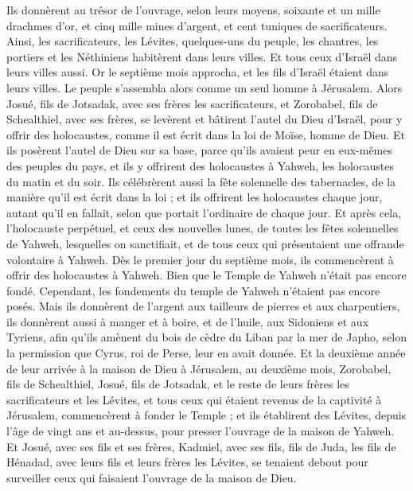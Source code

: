 \begin{multicols}{2}
Ils donnèrent au trésor de l'ouvrage, selon leurs moyens, soixante et un mille drachmes d'or, et cinq mille mines d'argent, et cent tuniques de sacrificateurs.
Ainsi, les sacrificateurs, les Lévites, quelques-uns du peuple, les chantres, les portiers et les Néthiniens habitèrent dans leurs villes. Et tous ceux d'Israël dans leurs villes aussi.
\VerseOne{}Or le septième mois approcha, et les fils d'Israël étaient dans leurs villes. Le peuple s'assembla alors comme un seul homme à Jérusalem.
Alors Josué, fils de Jotsadak, avec ses frères les sacrificateurs, et Zorobabel, fils de Schealthiel, avec ses frères, se levèrent et bâtirent l'autel du Dieu d'Israël, pour y offrir des holocaustes, comme il est écrit dans la loi de Moïse, homme de Dieu.
Et ils posèrent l'autel de Dieu sur sa base, parce qu'ils avaient peur en eux-mêmes des peuples du pays, et ils y offrirent des holocaustes à Yahweh, les holocaustes du matin et du soir.
Ils célébrèrent aussi la fête solennelle des tabernacles, de la manière qu’il est écrit dans la loi ; et ils offrirent les holocaustes chaque jour, autant qu’il en fallait, selon que portait l’ordinaire de chaque jour.
Et après cela, l'holocauste perpétuel, et ceux des nouvelles lunes, de toutes les fêtes solennelles de Yahweh, lesquelles on sanctifiait, et de tous ceux qui présentaient une offrande volontaire à Yahweh.
Dès le premier jour du septième mois, ils commencèrent à offrir des holocaustes à Yahweh. Bien que le Temple de Yahweh n'était pas encore fondé.
Cependant, les fondements du temple de Yahweh n'étaient pas encore posés.
Mais ils donnèrent de l’argent aux tailleurs de pierres et aux charpentiers, ils donnèrent aussi à manger et à boire, et de l’huile, aux Sidoniens et aux Tyriens, afin qu’ils amènent du bois de cèdre du Liban par la mer de Japho, selon la permission que Cyrus, roi de Perse, leur en avait donnée.
Et la deuxième année de leur arrivée à la maison de Dieu à Jérusalem, au deuxième mois, Zorobabel, fils de Schealthiel, Josué, fils de Jotsadak, et le reste de leurs frères les sacrificateurs et les Lévites, et tous ceux qui étaient revenus de la captivité à Jérusalem, commencèrent à fonder le Temple ; et ils établirent des Lévites, depuis l’âge de vingt ans et au-dessus, pour presser l’ouvrage de la maison de Yahweh.
Et Josué, avec ses fils et ses frères, Kadmiel, avec ses fils, fils de Juda, les fils de Hénadad, avec leurs fils et leurs frères les Lévites, se tenaient debout pour surveiller ceux qui faisaient l'ouvrage de la maison de Dieu.

\end{multicols}
